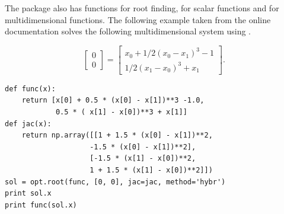 The  package also has functions for root finding, for scalar functions and for multidimensional functions. The following example taken from the online documentation solves the following multidimensional system using .

\[
\begin{bmatrix}
	0 \\
	0
\end{bmatrix} = \begin{bmatrix}
	x_{0} + 1/2 ( x_{0} - x_{1} )^{3} - 1 \\
	1/2(x_{1}-x_{0})^{3} + x_{1}
\end{bmatrix}.
\]

\begin{lstlisting}
def func(x):
    return [x[0] + 0.5 * (x[0] - x[1])**3 -1.0,
            0.5 * ( x[1] - x[0])**3 + x[1]]
def jac(x):
    return np.array([[1 + 1.5 * (x[0] - x[1])**2,
                    -1.5 * (x[0] - x[1])**2],
                    [-1.5 * (x[1] - x[0])**2,
                    1 + 1.5 * (x[1] - x[0])**2]])
sol = opt.root(func, [0, 0], jac=jac, method='hybr')
print sol.x
print func(sol.x)
\end{lstlisting}


